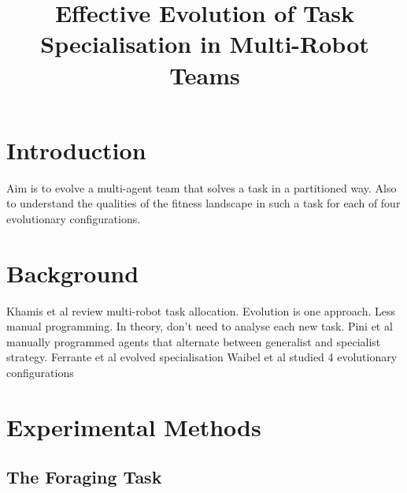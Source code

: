 \documentclass[12pt]{article}  %
\begin{document}
\title{Effective Evolution of Task Specialisation in Multi-Robot Teams}  
\maketitle


\section{Introduction}

Aim is to evolve a multi-agent team that solves a task in a partitioned way. 
Also to understand the qualities of the fitness landscape in such a task for each of four evolutionary configurations. 

\section{Background}

Khamis et al review multi-robot task allocation. Evolution is one approach. Less manual programming. In theory, don’t need to analyse each new task.
Pini et al manually programmed agents that alternate between generalist and specialist strategy.
Ferrante et al \cite{ferrante:PLOS_CB:2015} evolved specialisation 
Waibel et al studied 4 evolutionary configurations 

\section{Experimental Methods}

\subsection{The Foraging Task}
\end{document}
